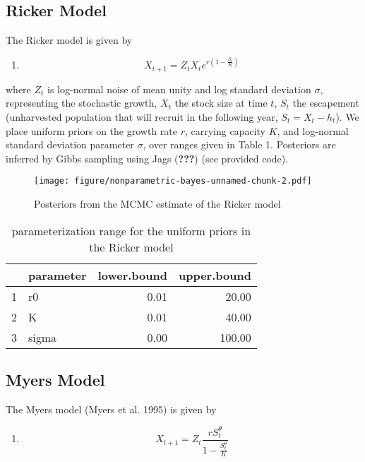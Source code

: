 \documentclass[author-year, review]{elsarticle} %
\makeatletter
\def\maxwidth{\ifdim\Gin@nat@width>\linewidth\linewidth
\else\Gin@nat@width\fi}
\let\Oldincludegraphics\includegraphics
\renewcommand{\includegraphics}[1]{\Oldincludegraphics[width=\maxwidth]{#1}}
\makeatother
\begin{document}
\subsection{Ricker Model}\label{ricker-model}

The Ricker model is given by

\begin{enumerate}
\def\labelenumi{(\arabic{enumi})}
\itemsep1pt\parskip0pt
\item
  \[X_{t+1} = Z_t X_t e^{r \left(1 - \frac{S_t}{K} \right) } \]
\end{enumerate}

where $Z_t$ is log-normal noise of mean unity and log standard deviation
$\sigma$, representing the stochastic growth, $X_t$ the stock size at
time $t$, $S_t$ the escapement (unharvested population that will recruit
in the following year, $S_t = X_t - h_t$). We place uniform priors on
the growth rate $r$, carrying capacity $K$, and log-normal standard
deviation parameter $\sigma$, over ranges given in Table 1. Posteriors
are inferred by Gibbs sampling using Jags ({\textbf{???}}) (see provided
code).

\begin{figure}[htbp]
\centering
\texttt{[image: figure/nonparametric-bayes-unnamed-chunk-2.pdf]}
\caption{Posteriors from the MCMC estimate of the Ricker model}
\end{figure}

\begin{table}[ht]
\begin{center}
\begin{tabular}{rlrr}
  \hline
 & parameter & lower.bound & upper.bound \\ 
  \hline
1 & r0 & 0.01 & 20.00 \\ 
  2 & K & 0.01 & 40.00 \\ 
  3 & sigma & 0.00 & 100.00 \\ 
   \hline
\end{tabular}
\caption{parameterization range for the uniform priors in the Ricker model}
\end{center}
\end{table}

\subsection{Myers Model}\label{myers-model}

The Myers model (Myers et al. 1995) is given by

\begin{enumerate}
\def\labelenumi{(\arabic{enumi})}
\setcounter{enumi}{1}
\itemsep1pt\parskip0pt
\item
  \[ X_{t+1} = Z_t \frac{r S_t^{\theta}}{1 - \frac{S_t^\theta}{K}}\]
\end{enumerate}
\end{document}
